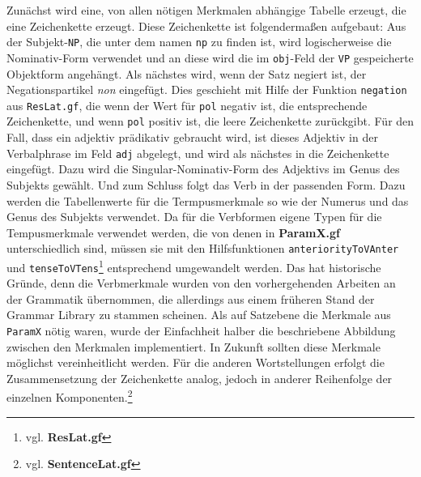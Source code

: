 Zunächst wird eine, von allen nötigen Merkmalen abhängige Tabelle erzeugt, die eine Zeichenkette erzeugt. Diese Zeichenkette ist folgendermaßen aufgebaut: Aus der Subjekt-\texttt{NP}, die unter dem namen \texttt{np} zu finden ist, wird logischerweise die Nominativ-Form verwendet und an diese wird die im \texttt{obj}-Feld der \texttt{VP} gespeicherte Objektform angehängt. Als nächstes wird, wenn der Satz negiert ist, der Negationspartikel \textit{non} eingefügt. Dies geschieht mit Hilfe der Funktion \texttt{negation} aus \texttt{ResLat.gf}, die wenn der Wert für \texttt{pol} negativ ist, die entsprechende Zeichenkette, und wenn \texttt{pol} positiv ist, die leere Zeichenkette zurückgibt. Für den Fall, dass ein adjektiv prädikativ gebraucht wird, ist dieses Adjektiv in der Verbalphrase im Feld \texttt{adj} abgelegt, und wird als nächstes in die Zeichenkette eingefügt. Dazu wird die Singular-Nominativ-Form des Adjektivs im Genus des Subjekts gewählt. Und zum Schluss folgt das Verb in der passenden Form. Dazu werden die Tabellenwerte für die Termpusmerkmale so wie der Numerus und das Genus des Subjekts verwendet. Da für die Verbformen eigene Typen für die Tempusmerkmale verwendet werden, die von denen in \textbf{ParamX.gf} unterschiedlich sind, müssen sie mit den Hilfsfunktionen \texttt{anteriorityToVAnter} und \texttt{tenseToVTens}\footnote{vgl. \textbf{ResLat.gf}} entsprechend umgewandelt werden. Das hat historische Gründe, denn die Verbmerkmale wurden von den vorhergehenden Arbeiten an der Grammatik übernommen, die allerdings aus einem früheren Stand der Grammar Library zu stammen scheinen. Als auf Satzebene die Merkmale aus \texttt{ParamX} nötig waren, wurde der Einfachheit halber die beschriebene Abbildung zwischen den Merkmalen implementiert. In Zukunft sollten diese Merkmale möglichst vereinheitlicht werden. Für die anderen Wortstellungen erfolgt die Zusammensetzung der Zeichenkette analog, jedoch in anderer Reihenfolge der einzelnen Komponenten.\footnote{vgl. \textbf{SentenceLat.gf}} \par

